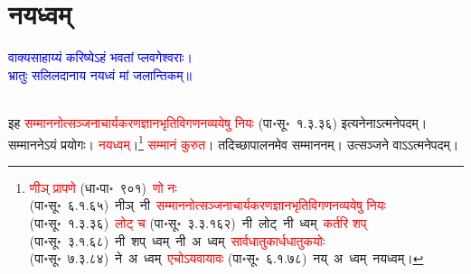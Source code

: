 \section[नयध्वम्]{नयध्वम्}
\centering\textcolor{blue}{वाक्यसाहाय्यं करिष्येऽहं भवतां प्लवगेश्वराः।\nopagebreak\\
भ्रातुः सलिलदानाय नयध्वं मां जलान्तिकम्॥}\nopagebreak\\
\\
\fontsize{14}{21}\selectfont\begin{sloppypar}\justifying\noindent\hspace{10mm} इह \textcolor{red}{सम्माननोत्सञ्जनाचार्य\-करण\-ज्ञान\-भृति\-विगणन\-व्ययेषु नियः} (पा॰सू॰~१.३.३६) इत्यनेनाऽत्मनेपदम्। सम्माननेऽयं प्रयोगः। \textcolor{red}{नयध्वम्}।\footnote{\textcolor{red}{णीञ् प्रापणे} (धा॰पा॰~९०१)~\arrow \textcolor{red}{णो नः} (पा॰सू॰~६.१.६५)~\arrow नीञ्~\arrow नी~\arrow \textcolor{red}{सम्माननोत्सञ्जनाचार्य\-करण\-ज्ञान\-भृति\-विगणन\-व्ययेषु नियः} (पा॰सू॰~१.३.३६)~\arrow \textcolor{red}{लोट् च} (पा॰सू॰~३.३.१६२)~\arrow नी~लोट्~\arrow नी~ध्वम्~\arrow \textcolor{red}{कर्तरि शप्} (पा॰सू॰~३.१.६८)~\arrow नी~शप्~ध्वम्~\arrow नी~अ~ध्वम्~\arrow \textcolor{red}{सार्वधातुकार्ध\-धातुकयोः} (पा॰सू॰~७.३.८४)~\arrow ने~अ~ध्वम्~\arrow \textcolor{red}{एचोऽयवायावः} (पा॰सू॰~६.१.७८)~\arrow नय्~अ~ध्वम्~\arrow नयध्वम्।} \textcolor{red}{सम्मानं कुरुत}। तदिच्छापालनमेव सम्माननम्। उत्सञ्जने वाऽऽत्मनेपदम्।\end{sloppypar}
